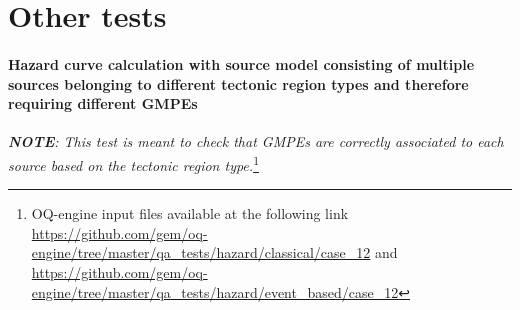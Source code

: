 \section{Other tests}
\paragraph{Hazard curve calculation with source model consisting of
multiple sources belonging to different tectonic region types and therefore
requiring different GMPEs} 
\label{sec:test12}
\textit{\textbf{NOTE}: This test is meant to check
that GMPEs are correctly associated to each source based on the tectonic region
type.}\footnote{
    OQ-engine input files available at the following link
    \url{https://github.com/gem/oq-engine/tree/master/qa_tests/hazard/classical/case_12}
    and 
    \url{https://github.com/gem/oq-engine/tree/master/qa_tests/hazard/event_based/case_12}
} 

